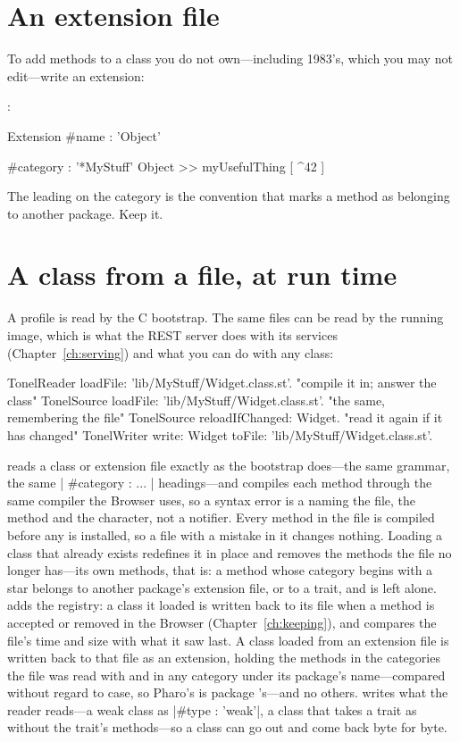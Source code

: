 \section{An extension file}

To add methods to a class you do not own---including 1983's, which you may not
edit---write an extension:

:

\begin{st}
Extension { #name : 'Object' }

{ #category : '*MyStuff' }
Object >> myUsefulThing [
	^42
]
\end{st}

The leading \ct{*} on the category is the convention that marks a method as
belonging to another package. Keep it.

\section{A class from a file, at run time}

A profile is read by the C bootstrap. The same files can be read by the
running image, which is what the REST server does with its services
(Chapter~\ref{ch:serving}) and what you can do with any class:

\begin{st}
TonelReader loadFile: 'lib/MyStuff/Widget.class.st'.     "compile it in; answer the class"
TonelSource loadFile: 'lib/MyStuff/Widget.class.st'.     "the same, remembering the file"
TonelSource reloadIfChanged: Widget.                     "read it again if it has changed"
TonelWriter write: Widget toFile: 'lib/MyStuff/Widget.class.st'.
\end{st}

 reads a class or extension file exactly as the bootstrap
does---the same grammar, the same \ct|{ #category : ... }| headings---and
compiles each method through the same compiler the Browser uses, so a syntax
error is a  naming the file, the method and the character,
not a notifier. Every method in the file is compiled before any is
installed, so a file with a mistake in it changes nothing. Loading a class
that already exists redefines it in place and removes the methods the file
no longer has---its own methods, that is: a method whose category begins with
a star belongs to another package's extension file, or to a trait, and is
left alone.  adds the registry: a class it loaded is written
back to its file when a method is accepted or removed in the Browser
(Chapter~\ref{ch:keeping}), and  compares the file's
time and size with what it saw last. A class loaded from an extension file
is written back to that file as an extension, holding the methods in the
categories the file was read with and in any category under its package's
name---compared without regard to case, so Pharo's  is package
's---and no others.  writes what the reader reads---a weak class as
\ct|#type : 'weak'|, a class that takes a trait as  without
the trait's methods---so a class can go out and come back byte for byte.


